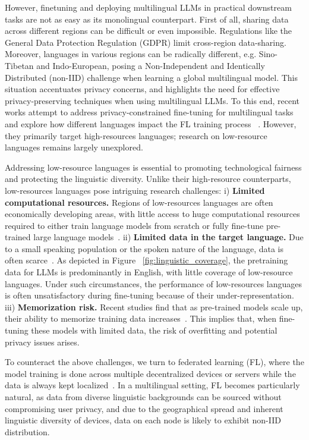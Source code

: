 \documentclass[withindex,glossary,firstyr]{cam-thesis}
\begin{document}
However, finetuning and deploying multilingual LLMs in practical downstream tasks are not as easy as its monolingual counterpart. First of all, sharing data across different regions can be difficult or even impossible. Regulations like the General Data Protection Regulation (GDPR) \cite{lim2020federated} limit cross-region data-sharing. Moreover, languages in various regions can be radically different, e.g. Sino-Tibetan and Indo-European, posing a Non-Independent and Identically Distributed (non-IID) challenge when learning a global multilingual model.
%
%
This situation accentuates privacy concerns, and highlights the need for effective privacy-preserving techniques when using multilingual LLMs. 
%
To this end, recent works attempt to address privacy-constrained fine-tuning for multilingual tasks and explore how different languages impact the FL training process ~\cite{Weller2022PretrainedMF}. 
%
However, they primarily target high-resources languages; research on low-resource languages remains largely unexplored.


Addressing low-resource languages is essential to promoting technological fairness and protecting the linguistic diversity. Unlike their high-resource counterparts, low-resources languages pose intriguing research challenges: 
%
i) \textbf{Limited computational resources.} Regions of low-resources languages are often economically developing areas, with little access to huge computational resources required to either train language models from scratch or fully fine-tune pre-trained large language models~\citep{mager2021findings,adebara-abdul-mageed-2022-towards}.
ii) \textbf{Limited data in the target language.} Due to a small speaking population or the spoken nature of the language, data is often scarce~\cite{adelani2021masakhaner,muhammad2022naijasenti,ebrahimi-etal-2022-americasnli}. As depicted in Figure ~\ref{fig:linguistic_coverage}, the pretraining data for LLMs is predominantly in English, with little coverage of low-resource languages. Under such circumstances, the performance of low-resources languages is often unsatisfactory during fine-tuning because of their under-representation.
iii) \textbf{Memorization risk.} Recent studies find that as pre-trained models scale up, their ability to memorize training data increases~\cite{tirumala2022memorization}. This implies that, when fine-tuning these models with limited data, the risk of overfitting and potential privacy issues arises.

To counteract the above challenges, we turn to federated learning (FL), where the model training is done across multiple decentralized devices or servers while the data is always kept localized~\cite{fedavg, fedprox, yang2019federated}. In a multilingual setting, FL becomes particularly natural, as data from diverse linguistic backgrounds can be sourced without compromising user privacy, and due to the geographical spread and inherent linguistic diversity of devices, data on each node is likely to exhibit non-IID distribution.
\end{document}
